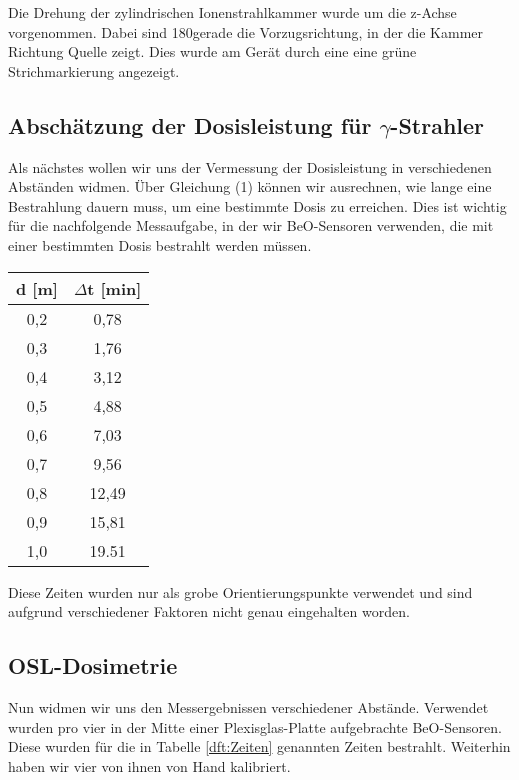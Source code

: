 Die Drehung der zylindrischen Ionenstrahlkammer wurde um die z-Achse vorgenommen. Dabei sind 180\textdegree gerade die Vorzugsrichtung, in der die Kammer Richtung Quelle zeigt. Dies wurde am Gerät durch eine eine grüne Strichmarkierung angezeigt.

\subsection{Abschätzung der Dosisleistung für $\gamma$-Strahler}

Als nächstes wollen wir uns der Vermessung der Dosisleistung in verschiedenen Abständen widmen. Über Gleichung (1) können wir ausrechnen, wie lange eine Bestrahlung dauern muss, um eine bestimmte Dosis zu erreichen. Dies ist wichtig für die nachfolgende Messaufgabe, in der wir BeO-Sensoren verwenden, die mit einer bestimmten Dosis bestrahlt werden müssen.

\vspace{5mm}
\minipanf
	\begin{center}
		\begin{tabular}{c|c}
				   \textbf{d} [m] & \textbf{$\Delta$t} [min] \\ 
		\hline     0,2 &  0,78 \\ 
				   0,3 &  1,76 \\ 
				   0,4 &  3,12 \\ 
				   0,5 &  4,88 \\ 
				   0,6 &  7,03 \\ 
				   0,7 &  9,56 \\ 
				   0,8 & 12,49 \\ 
				   0,9 & 15,81 \\ 
				   1,0 & 19.51 \\  
		\end{tabular}
		\label{dft:Zeiten} 
	\end{center}
\minipend
\vspace{5mm}

Diese Zeiten wurden nur als grobe Orientierungspunkte verwendet und sind aufgrund verschiedener Faktoren nicht genau eingehalten worden.

\subsection{OSL-Dosimetrie}
Nun widmen wir uns den Messergebnissen verschiedener Abstände. Verwendet wurden pro vier in der Mitte einer Plexisglas-Platte aufgebrachte BeO-Sensoren. Diese wurden für die in Tabelle \ref{dft:Zeiten} genannten Zeiten bestrahlt. Weiterhin haben wir vier von ihnen von Hand kalibriert.

